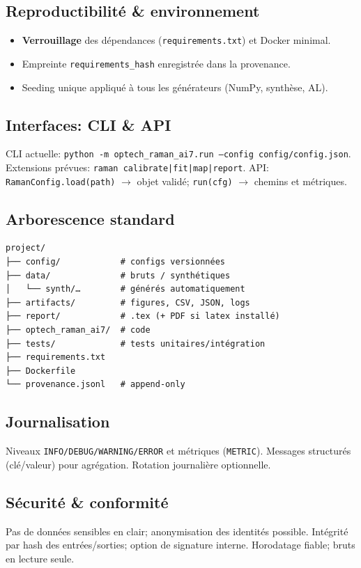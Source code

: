 \subsection{Reproductibilité \& environnement}
\begin{itemize}[nosep]
\item \textbf{Verrouillage} des dépendances (\texttt{requirements.txt}) et Docker minimal.
\item Empreinte \texttt{requirements\_hash} enregistrée dans la provenance.
\item Seeding unique appliqué à tous les générateurs (NumPy, synthèse, AL).
\end{itemize}

\subsection{Interfaces: CLI \& API}
CLI actuelle: \texttt{python -m optech\_raman\_ai7.run --config config/config.json}. Extensions prévues: \texttt{raman calibrate|fit|map|report}. API: \texttt{RamanConfig.load(path)} $\rightarrow$ objet validé; \texttt{run(cfg)} $\rightarrow$ chemins et métriques.

\subsection{Arborescence standard}
\begin{verbatim}
project/
├── config/            # configs versionnées
├── data/              # bruts / synthétiques
│   └── synth/…        # générés automatiquement
├── artifacts/         # figures, CSV, JSON, logs
├── report/            # .tex (+ PDF si latex installé)
├── optech_raman_ai7/  # code
├── tests/             # tests unitaires/intégration
├── requirements.txt
├── Dockerfile
└── provenance.jsonl   # append-only
\end{verbatim}

\subsection{Journalisation}
Niveaux \texttt{INFO/DEBUG/WARNING/ERROR} et métriques (\texttt{METRIC}). Messages structurés (clé/valeur) pour agrégation. Rotation journalière optionnelle.

\subsection{Sécurité \& conformité}
Pas de données sensibles en clair; anonymisation des identités possible. Intégrité par hash des entrées/sorties; option de signature interne. Horodatage fiable; bruts en lecture seule.

